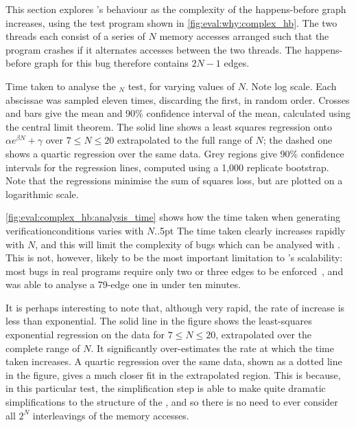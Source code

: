 \noindent
This section explores {\implementation}'s behaviour as the complexity
of the happens-before graph increases, using the test program shown in
\autoref{fig:eval:why:complex_hb}.  The two threads each consist of a
series of $N$ memory accesses arranged such that the program crashes
if it alternates accesses between the two threads.  The happens-before
graph for this bug therefore contains $2N-1$ edges.

\begin{sanefig}
  \caption{Time taken to analyse the $_N$ test,
    for varying values of $N$.  Note log scale.  Each abscissae was
    sampled eleven times, discarding the first, in random order.
    Crosses and bars give the mean and 90\% confidence interval of the
    mean, calculated using the central limit theorem.  The solid line
    shows a least squares regression onto ${\alpha}e^{{\beta}N} +
    \gamma$ over $7 \leq N \leq 20$ extrapolated to the full range of
    $N$; the dashed one shows a quartic regression over the same data.
    Grey regions give 90\% confidence intervals for the regression
    lines, computed using a 1,000 replicate bootstrap.  Note that the
    regressions minimise the sum of squares loss, but are plotted on a
    logarithmic scale.}
  \label{fig:eval:complex_hb:analysis_time}
\end{sanefig}

\autoref{fig:eval:complex_hb:analysis_time} shows how the time taken
when generating \glspl{verificationcondition} varies with
$N$\kern-1pt.\kern.5pt  The time taken clearly
increases rapidly with $N$\kern-1pt, and this will limit the complexity of bugs
which can be analysed with {\technique}.  This is not, however, likely
to be the most important limitation to {\technique}'s scalability:
most bugs in real programs require only two or three edges to be
enforced~\cite{Musuvathi2008}, and {\implementation} was able to analyse a
79-edge one in under ten minutes.

It is perhaps interesting to note that, although very rapid, the rate
of increase is less than exponential.  The solid line in the figure
shows the least-squares exponential regression on the data for $7 \leq
N \leq 20$, extrapolated over the
complete range of $N$.  It significantly over-estimates the rate at
which the time taken increases.  A quartic regression over the same
data, shown as a dotted line in the figure, gives a much closer fit in
the extrapolated region.  This is because, in this particular test,
the {\StateMachine} simplification step is able to make quite dramatic
simplifications to the structure of the {\StateMachines}, and so there
is no need to ever consider all $2^N$ interleavings of the memory
accesses.

